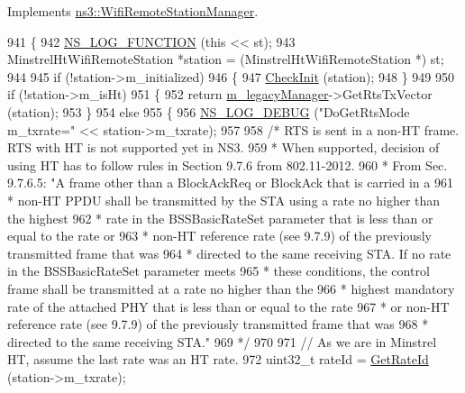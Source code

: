 Implements \hyperlink{classns3_1_1WifiRemoteStationManager_abf44eccb31d4b1b58644fd6721d132c9}{ns3\+::\+Wifi\+Remote\+Station\+Manager}.


\begin{DoxyCode}
941 \{
942   \hyperlink{log-macros-disabled_8h_a90b90d5bad1f39cb1b64923ea94c0761}{NS\_LOG\_FUNCTION} (\textcolor{keyword}{this} << st);
943   MinstrelHtWifiRemoteStation *station = (MinstrelHtWifiRemoteStation *) st;
944 
945   \textcolor{keywordflow}{if} (!station->m\_initialized)
946     \{
947       \hyperlink{classns3_1_1MinstrelHtWifiManager_a7f94804a34efa6121bdfd5d01ac34694}{CheckInit} (station);
948     \}
949 
950   \textcolor{keywordflow}{if} (!station->m\_isHt)
951     \{
952       \textcolor{keywordflow}{return} \hyperlink{classns3_1_1MinstrelHtWifiManager_ae10ffd948e46a60593b1aef80372082a}{m\_legacyManager}->GetRtsTxVector (station);
953     \}
954   \textcolor{keywordflow}{else}
955     \{
956       \hyperlink{group__logging_ga413f1886406d49f59a6a0a89b77b4d0a}{NS\_LOG\_DEBUG} (\textcolor{stringliteral}{"DoGetRtsMode m\_txrate="} << station->m\_txrate);
957 
958       \textcolor{comment}{/* RTS is sent in a non-HT frame. RTS with HT is not supported yet in NS3.}
959 \textcolor{comment}{       * When supported, decision of using HT has to follow rules in Section 9.7.6 from 802.11-2012.}
960 \textcolor{comment}{       * From Sec. 9.7.6.5: "A frame other than a BlockAckReq or BlockAck that is carried in a}
961 \textcolor{comment}{       * non-HT PPDU shall be transmitted by the STA using a rate no higher than the highest}
962 \textcolor{comment}{       * rate in  the BSSBasicRateSet parameter that is less than or equal to the rate or}
963 \textcolor{comment}{       * non-HT reference rate (see 9.7.9) of the previously transmitted frame that was}
964 \textcolor{comment}{       * directed to the same receiving STA. If no rate in the BSSBasicRateSet parameter meets}
965 \textcolor{comment}{       * these conditions, the control frame shall be transmitted at a rate no higher than the}
966 \textcolor{comment}{       * highest mandatory rate of the attached PHY that is less than or equal to the rate}
967 \textcolor{comment}{       * or non-HT reference rate (see 9.7.9) of the previously transmitted frame that was}
968 \textcolor{comment}{       * directed to the same receiving STA."}
969 \textcolor{comment}{       */}
970 
971       \textcolor{comment}{// As we are in Minstrel HT, assume the last rate was an HT rate.}
972       uint32\_t rateId = \hyperlink{classns3_1_1MinstrelHtWifiManager_a6162341f1348bbe713d09642b09ac658}{GetRateId} (station->m\_txrate);

\end{DoxyCode}
